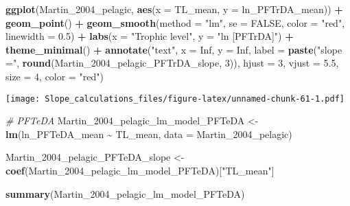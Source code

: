 \documentclass[
]{article}
\newenvironment{Shaded}{\begin{snugshade}}{\end{snugshade}}
\newcommand{\AttributeTok}[1]{\textcolor[rgb]{0.13,0.29,0.53}{#1}}
\newcommand{\CommentTok}[1]{\textcolor[rgb]{0.56,0.35,0.01}{\textit{#1}}}
\newcommand{\ConstantTok}[1]{\textcolor[rgb]{0.56,0.35,0.01}{#1}}
\newcommand{\DecValTok}[1]{\textcolor[rgb]{0.00,0.00,0.81}{#1}}
\newcommand{\FloatTok}[1]{\textcolor[rgb]{0.00,0.00,0.81}{#1}}
\newcommand{\FunctionTok}[1]{\textcolor[rgb]{0.13,0.29,0.53}{\textbf{#1}}}
\newcommand{\NormalTok}[1]{#1}
\newcommand{\OtherTok}[1]{\textcolor[rgb]{0.56,0.35,0.01}{#1}}
\newcommand{\SpecialCharTok}[1]{\textcolor[rgb]{0.81,0.36,0.00}{\textbf{#1}}}
\newcommand{\StringTok}[1]{\textcolor[rgb]{0.31,0.60,0.02}{#1}}
\begin{document}
\begin{Shaded}
\begin{Highlighting}[]
\FunctionTok{ggplot}\NormalTok{(Martin\_2004\_pelagic, }\FunctionTok{aes}\NormalTok{(}\AttributeTok{x =}\NormalTok{ TL\_mean, }\AttributeTok{y =}\NormalTok{ ln\_PFTrDA\_mean)) }\SpecialCharTok{+}
  \FunctionTok{geom\_point}\NormalTok{() }\SpecialCharTok{+}
  \FunctionTok{geom\_smooth}\NormalTok{(}\AttributeTok{method =} \StringTok{"lm"}\NormalTok{, }\AttributeTok{se =} \ConstantTok{FALSE}\NormalTok{, }\AttributeTok{color =} \StringTok{"red"}\NormalTok{, }\AttributeTok{linewidth =} \FloatTok{0.5}\NormalTok{) }\SpecialCharTok{+}
  \FunctionTok{labs}\NormalTok{(}\AttributeTok{x =} \StringTok{"Trophic level"}\NormalTok{,}
       \AttributeTok{y =} \StringTok{"ln [PFTrDA]"}\NormalTok{) }\SpecialCharTok{+}
  \FunctionTok{theme\_minimal}\NormalTok{() }\SpecialCharTok{+}
  \FunctionTok{annotate}\NormalTok{(}\StringTok{"text"}\NormalTok{, }\AttributeTok{x =} \ConstantTok{Inf}\NormalTok{, }\AttributeTok{y =} \ConstantTok{Inf}\NormalTok{, }\AttributeTok{label =} \FunctionTok{paste}\NormalTok{(}\StringTok{"slope ="}\NormalTok{, }\FunctionTok{round}\NormalTok{(Martin\_2004\_pelagic\_PFTrDA\_slope, }\DecValTok{3}\NormalTok{)), }
           \AttributeTok{hjust =} \DecValTok{3}\NormalTok{, }\AttributeTok{vjust =} \FloatTok{5.5}\NormalTok{, }\AttributeTok{size =} \DecValTok{4}\NormalTok{, }\AttributeTok{color =} \StringTok{"red"}\NormalTok{)}
\end{Highlighting}
\end{Shaded}

\texttt{[image: Slope\_calculations\_files/figure-latex/unnamed-chunk-61-1.pdf]}

\begin{Shaded}
\begin{Highlighting}[]
\CommentTok{\# PFTeDA}
\NormalTok{Martin\_2004\_pelagic\_lm\_model\_PFTeDA }\OtherTok{\textless{}{-}} \FunctionTok{lm}\NormalTok{(ln\_PFTeDA\_mean }\SpecialCharTok{\textasciitilde{}}\NormalTok{ TL\_mean, }
                                        \AttributeTok{data =}\NormalTok{ Martin\_2004\_pelagic)}

\NormalTok{Martin\_2004\_pelagic\_PFTeDA\_slope }\OtherTok{\textless{}{-}} \FunctionTok{coef}\NormalTok{(Martin\_2004\_pelagic\_lm\_model\_PFTeDA)[}\StringTok{"TL\_mean"}\NormalTok{]}

\FunctionTok{summary}\NormalTok{(Martin\_2004\_pelagic\_lm\_model\_PFTeDA)}
\end{Highlighting}
\end{Shaded}
\end{document}
